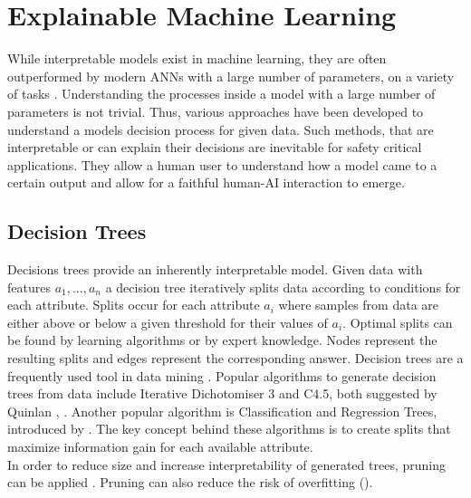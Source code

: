 \documentclass[a4paper,cleardoubleempty,BCOR1cm, 11pt]{report}
\begin{document}
\section{Explainable Machine Learning}
While interpretable models exist in machine learning, they are often outperformed by modern ANNs with a large number of parameters, on a variety of tasks \cite{gunning2019xai, guo2020explainable, sarkar2016accuracy, puiutta2020explainable}. Understanding the processes inside a model with a large number of parameters is not trivial. Thus, various approaches have been developed to understand a models decision process for given data. Such methods, that are interpretable or can explain their decisions are inevitable for safety critical applications. They allow a human user to understand how a model came to a certain output and allow for a faithful human-AI interaction to emerge.


\subsection{Decision Trees}
Decisions trees provide an inherently interpretable model. Given data with features $a_1, ..., a_n$ a decision tree iteratively splits data according to conditions for each attribute. Splits occur for each attribute $a_i$ where samples from data are either above or below a given threshold for their values of $a_i$. Optimal splits can be found by learning algorithms or by expert knowledge. Nodes represent the resulting splits and edges represent the corresponding answer.
Decision trees are a frequently used tool in data mining \cite{wu2008top}. Popular algorithms to generate decision trees from data include Iterative Dichotomiser 3 and C4.5, both suggested by Quinlan \cite{quinlan1986induction}, \cite{quinlan2014c4}.
Another popular algorithm is Classification and Regression Trees, introduced by \citet{breiman1984classification}. The key concept behind these algorithms is to create splits that maximize information gain for each available attribute.\\
In order to reduce size and increase interpretability of generated trees, pruning can be applied \cite{mingers1989empirical}. Pruning can also reduce the risk of overfitting (\cite{kearns1998fast}).
\end{document}
